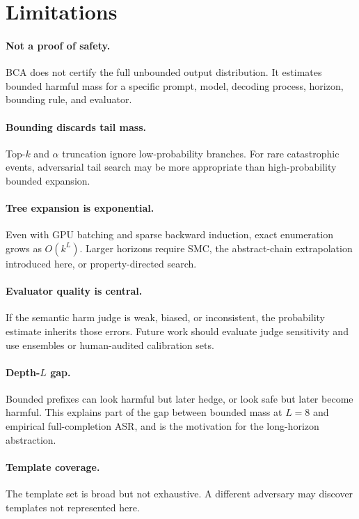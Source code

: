 \documentclass[11pt]{article}
\newcommand{\BCA}{\textsc{BCA}}
\newcommand{\ASR}{\textsc{ASR}}
\begin{document}
\section{Limitations}
\label{sec:limitations}

\paragraph{Not a proof of safety.}
\BCA{} does not certify the full unbounded output distribution.  It estimates bounded harmful mass for a specific prompt, model, decoding process, horizon, bounding rule, and evaluator.

\paragraph{Bounding discards tail mass.}
Top-$k$ and $\alpha$ truncation ignore low-probability branches.  For rare catastrophic events, adversarial tail search may be more appropriate than high-probability bounded expansion.

\paragraph{Tree expansion is exponential.}
Even with GPU batching and sparse backward induction, exact enumeration grows as $O(k^L)$.  Larger horizons require SMC, the abstract-chain extrapolation introduced here, or property-directed search.

\paragraph{Evaluator quality is central.}
If the semantic harm judge is weak, biased, or inconsistent, the probability estimate inherits those errors.  Future work should evaluate judge sensitivity and use ensembles or human-audited calibration sets.

\paragraph{Depth-$L$ gap.}
Bounded prefixes can look harmful but later hedge, or look safe but later become harmful.  This explains part of the gap between bounded mass at $L=8$ and empirical full-completion \ASR{}, and is the motivation for the long-horizon abstraction.

\paragraph{Template coverage.}
The template set is broad but not exhaustive.  A different adversary may discover templates not represented here.
\end{document}
